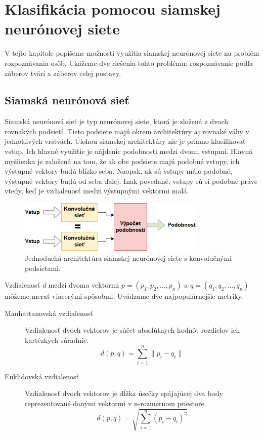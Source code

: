 \chapter{Klasifikácia pomocou siamskej neurónovej siete}
\label{kap:siamese}
V tejto kapitole popíšeme možnosti využitia siamskej neurónovej siete na problém rozpoznávania osôb.
Ukážeme dve riešenia tohto problému: rozpoznávanie podľa záberov tvárí a záberov celej postavy.

\section{Siamská neurónová sieť}
Siamská neurónová sieť je typ neurónovej siete, ktorá je zložená z dvoch rovnakých podsietí. 
Tieto podsiete majú okrem architektúry aj rovnaké váhy v jednotlivých vrstvách.
Úlohou siamskej architektúry nie je priamo klasifikovať vstup.
Ich hlavné využitie je nájdenie podobnosti medzi dvomi vstupmi.
Hlavná myšlienka je založená na tom, že ak obe podsiete majú podobné vstupy, ich výstupné vektory budú blízko seba.
Naopak, ak sú vstupy málo podobné, výstupné vektory budú od seba ďalej.
Inak povedané, vstupy sú si podobné práve vtedy, keď je vzdialenosť medzi výstupnými vektormi malá.

\begin{figure}[H]
\centerline{\includegraphics[width=0.8\textwidth]{images/siamese_diagram}}
\caption[Siamska neurónová sieť]{Jednoduchá architektúra siamskej neurónovej siete s konvolučnými podsieťami.}
\label{obr:siamese_diagram}
\end{figure}

Vzdialenosť \textit{d} medzi dvoma vektormi $p = (p_1, p_2, ..., p_n)$ a $q = (q_1, q_2, ..., q_n)$ 
môžeme merať viacerými spôsobmi. Uvádzame dve najpopulárnejšie metriky.

\begin{description}
\item[Manhattanovská vzdialenosť]
Vzdialenosť dvoch vektorov je súčet absolútnych hodnôt rozdielov ich kartézkych súradníc.
$$d(p, q) = \sum_{i=1}^{n} \| p_i - q_i \|$$

\item[Euklidovská vzdialenosť]
Vzdialenosť dvoch vektorov je dĺžka úsečky spájajúcej dva body reprezentované danými vektormi v n-rozmernom priestore.
$$d(p, q) = \sqrt{ \sum_{i=1}^{n} ( p_i - q_i )^2}$$
\end{description}


